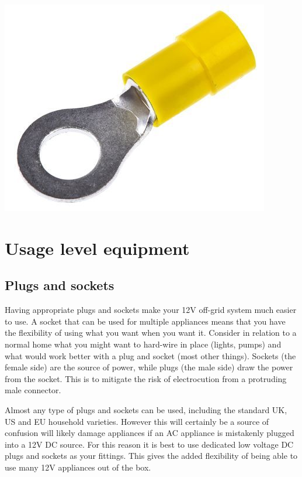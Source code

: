 \documentclass{article}
\theoremstyle{definition}
\theoremstyle{definition}
\theoremstyle{remark}
\begin{document}
      \begin{center}
        \includegraphics[width=0.15\paperwidth]{../Images/image_8_5_(ring_connector).png}
      \end{center}
    



\section{Usage level equipment} %
\label{sec:usage_level_equipment}

  \subsection{Plugs and sockets} %
  \label{sub:plugs_and_sockets}

    Having appropriate plugs and sockets make your 12V off-grid system much easier to use. A socket that can be used for multiple appliances means that you have the flexibility of using what you want when you want it. Consider in relation to a normal home what you might want to hard-wire in place (lights, pumps) and what would work better with a plug and socket (most other things). Sockets (the female side) are the source of power, while plugs (the male side) draw the power from the socket. This is to mitigate the risk of electrocution from a protruding male connector. 

    Almost any type of plugs and sockets can be used, including the standard UK, US and EU household varieties. However this will certainly be a source of confusion will likely damage appliances if an AC appliance is mistakenly plugged into a 12V DC source. For this reason it is best to use dedicated low voltage DC plugs and sockets as your fittings. This gives the added flexibility of being able to use many 12V appliances out of the box.
\end{document}
